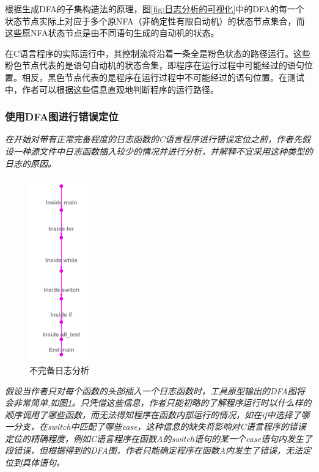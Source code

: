 根据生成DFA的子集构造法的原理，图\ref{fig:日志分析的可视化}中的DFA的每一个状态节点实际上对应于多个原NFA（非确定性有限自动机）的状态节点集合，而这些原NFA状态节点是由不同语句生成的自动机的状态。


在C语言程序的实际运行中，其控制流将沿着一条全是粉色状态的路径运行。这些粉色节点代表的是语句自动机的状态合集，即程序在运行过程中可能经过的语句位置。相反，黑色节点代表的是程序在运行过程中不可能经过的语句位置。在测试中，作者可以根据这些信息直观地判断程序的运行路径。




\subsubsection{使用DFA图进行错误定位}
\emph {在开始对带有正常完备程度的日志函数的C语言程序进行错误定位之前，作者先假设一种源文件中日志函数插入较少的情况并进行分析，并解释不宜采用这种类型的日志的原因。}
\begin{figure}[htbp]
	\centering
	\includegraphics[width=0.25\textwidth]{pictures/不完备日志下的输出.png}
	\caption{不完备日志分析}
	\label{fig:不完备日志分析}
\end{figure}

\emph {假设当作者只对每个函数的头部插入一个日志函数时，工具原型输出的DFA图将会非常简单,如图\ref{fig:不完备日志分析}。只凭借这些信息，作者只能初略的了解程序运行时以什么样的顺序调用了哪些函数，而无法得知程序在函数内部运行的情况，如在if中选择了哪一分支，在switch中匹配了哪些case，这种信息的缺失将影响对C语言程序的错误定位的精确程度，例如C语言程序在函数A的switch语句的某一个case语句内发生了段错误，但根据得到的DFA图，作者只能确定程序在函数A内发生了错误，无法定位到具体语句。}

